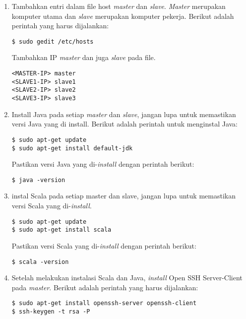 \begin{enumerate}

\item Tambahkan entri dalam file host \textit{master} dan \textit{slave}. \textit{Master} merupakan komputer utama dan \textit{slave} merupakan komputer pekerja. Berikut adalah perintah yang harus dijalankan: 

\begin{verbatim}
$ sudo gedit /etc/hosts
\end{verbatim}

Tambahkan IP \textit{master} dan juga \textit{slave} pada file.

\begin{verbatim}
<MASTER-IP> master
<SLAVE1-IP> slave1
<SLAVE2-IP> slave2
<SLAVE3-IP> slave3
\end{verbatim}

\item Install Java pada setiap \textit{master} dan \textit{slave}, jangan lupa untuk memastikan versi Java yang di install. Berikut adalah perintah untuk menginstal Java:

\begin{verbatim}
$ sudo apt-get update
$ sudo apt-get install default-jdk
\end{verbatim}

Pastikan versi Java yang di-\textit{install} dengan perintah berikut:

\begin{verbatim}
$ java -version
\end{verbatim}

\item instal Scala pada setiap master dan slave, jangan lupa untuk memastikan versi Scala yang di-\textit{install}.

\begin{verbatim}
$ sudo apt-get update
$ sudo apt-get install scala
\end{verbatim}

Pastikan versi Scala yang di-\textit{install} dengan perintah berikut:

\begin{verbatim}
$ scala -version
\end{verbatim}

\item Setelah melakukan instalasi Scala dan Java, \textit{install} Open SSH Server-Client pada \textit{master}. Berikut adalah perintah yang harus dijalankan:

\begin{verbatim}
$ sudo apt-get install openssh-server openssh-client
$ ssh-keygen -t rsa -P 
\end{verbatim}


\end{enumerate}
